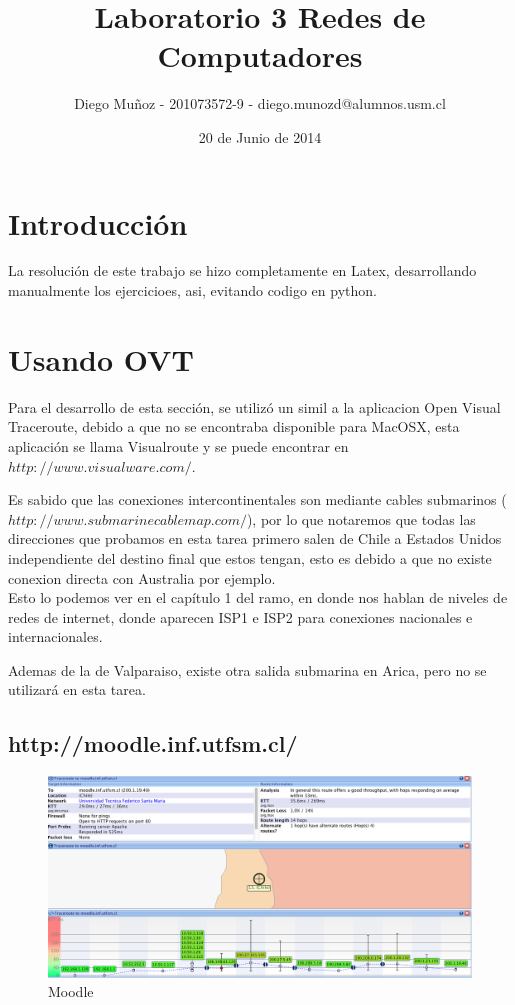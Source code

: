 \documentclass[a4papaer]{article}
\begin{document}
 
\title{Laboratorio 3 Redes de Computadores}
\author{Diego Muñoz - 201073572-9 - diego.munozd@alumnos.usm.cl}
\date{20 de Junio de 2014}
\maketitle
 
\section{Introducción}
 
La resolución de este trabajo se hizo completamente en Latex, desarrollando manualmente los ejercicioes, asi, evitando codigo en python.
 
\section{Usando OVT}
 
Para el desarrollo de esta sección, se utilizó un simil a la aplicacion Open Visual Traceroute, debido a que no se encontraba disponible para MacOSX, esta aplicación se llama Visualroute y se puede encontrar en $http://www.visualware.com/$.

Es sabido que las conexiones intercontinentales son mediante cables submarinos ($http://www.submarinecablemap.com/$), por lo que notaremos que todas las direcciones que probamos en esta tarea primero salen de Chile a Estados Unidos independiente del destino final que estos tengan, esto es debido a que no existe conexion directa con Australia por ejemplo. \\

Esto lo podemos ver en el capítulo 1 del ramo, en donde nos hablan de niveles de redes de internet, donde aparecen ISP1 e ISP2 para conexiones nacionales e internacionales.

Ademas de la de Valparaiso, existe otra salida submarina en Arica, pero no se utilizará en esta tarea.

\subsection{http://moodle.inf.utfsm.cl/}

\begin{figure}[h]
  \centering
    \includegraphics[width=1\textwidth]{ss1}
  \caption{Moodle}
  \label{fig:Trace Route de http://moodle.inf.utfsm.cl/}
\end{figure}
\end{document}
